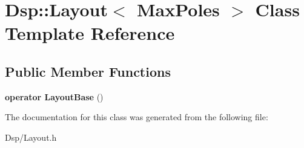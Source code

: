 \hypertarget{classDsp_1_1Layout}{\section{Dsp\-:\-:Layout$<$ Max\-Poles $>$ Class Template Reference}
\label{classDsp_1_1Layout}
}
\subsection*{Public Member Functions}
\begin{DoxyCompactItemize}
\item 
\hypertarget{classDsp_1_1Layout_a904310de92bfd4cb5cef2ceeb0f54c79}{{\bfseries operator Layout\-Base} ()}\label{classDsp_1_1Layout_a904310de92bfd4cb5cef2ceeb0f54c79}

\end{DoxyCompactItemize}


The documentation for this class was generated from the following file\-:\begin{DoxyCompactItemize}
\item 
Dsp/Layout.\-h\end{DoxyCompactItemize}
